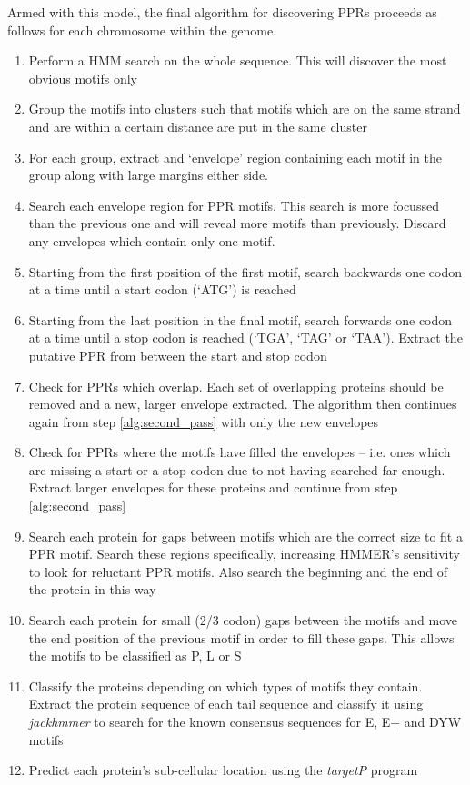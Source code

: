 Armed with this model, the final algorithm for discovering PPRs proceeds as
follows for each chromosome within the genome
\begin{enumerate}
  \item \label{alg:first_pass}
    Perform a HMM search on the whole sequence. This will discover the most
    obvious motifs only
  \item \label{alg:grouping}
    Group the motifs into clusters such that motifs which are on the same
    strand and are within a certain distance are put in the same cluster
  \item \label{alg:envelopes} 
    For each group, extract and `envelope' region containing each motif in the
    group along with large margins either side. 
  \item \label{alg:second_pass}
    Search each envelope region for PPR motifs. This search is more
    focussed than the previous one and will reveal more motifs than previously.
    Discard any envelopes which contain only one motif.
  \item Starting from the first position of the first motif, search backwards
    one codon at a time until a start codon (`ATG') is reached
  \item Starting from the last position in the final motif, search forwards one
    codon at a time until a stop codon is reached (`TGA', `TAG' or `TAA').
    Extract the putative PPR from between the start and stop codon
  \item \label{alg:overlap}
    Check for PPRs which overlap. 
    Each set of overlapping proteins should be removed and a new, larger
    envelope extracted. The algorithm then continues again from step
    \ref{alg:second_pass} with only the new envelopes
  \item \label{alg:large_proteins}
    Check for PPRs where the motifs have filled the envelopes -- i.e. ones
    which are missing a start or a stop codon due to not having searched far
    enough. Extract larger envelopes for these proteins and continue from step
    \ref{alg:second_pass}
  \item \label{alg:reluctance}
    Search each protein for gaps between motifs which are the correct size
    to fit a PPR motif. Search these regions specifically, increasing HMMER's
    sensitivity to look for reluctant PPR
    motifs. Also search the beginning and the end of the protein in this way
  \item \label{alg:remove_gaps}
    Search each protein for small (2/3 codon) gaps between the motifs and
    move the end position of the previous motif in order to fill these gaps.
    This allows the motifs to be classified as P, L or S
  \item \label{alg:classification} 
    Classify the proteins depending on which types of motifs they contain.
    Extract the protein sequence of each tail sequence and classify it using
    \emph{jackhmmer} to search for the known consensus sequences for E, E+ and
    DYW motifs
  \item \label{alg:subcellular_location}
    Predict each protein's sub-cellular location using the \emph{targetP}
    program
\end{enumerate}
